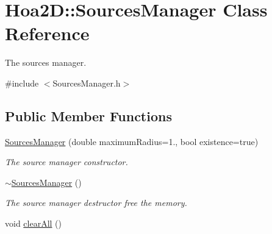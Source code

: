 \hypertarget{class_hoa2_d_1_1_sources_manager}{\section{Hoa2\-D\-:\-:Sources\-Manager Class Reference}
\label{class_hoa2_d_1_1_sources_manager}
}


The sources manager.  




{\ttfamily \#include $<$Sources\-Manager.\-h$>$}

\subsection*{Public Member Functions}
\begin{DoxyCompactItemize}
\item 
\hyperlink{class_hoa2_d_1_1_sources_manager_a9af44e634cc63d77fce116baa8d03886}{Sources\-Manager} (double maximum\-Radius=1., bool existence=true)
\begin{DoxyCompactList}\small\item\em The source manager constructor. \end{DoxyCompactList}\item 
\hypertarget{class_hoa2_d_1_1_sources_manager_ae116065cec424f8c845b8fa4ade1e718}{\hyperlink{class_hoa2_d_1_1_sources_manager_ae116065cec424f8c845b8fa4ade1e718}{$\sim$\-Sources\-Manager} ()}\label{class_hoa2_d_1_1_sources_manager_ae116065cec424f8c845b8fa4ade1e718}

\begin{DoxyCompactList}\small\item\em The source manager destructor free the memory. \end{DoxyCompactList}\item 
\hypertarget{class_hoa2_d_1_1_sources_manager_a1b248551ce36262e064d88b41eba076b}{void \hyperlink{class_hoa2_d_1_1_sources_manager_a1b248551ce36262e064d88b41eba076b}{clear\-All} ()}\label{class_hoa2_d_1_1_sources_manager_a1b248551ce36262e064d88b41eba076b}


\end{DoxyCompactItemize}
